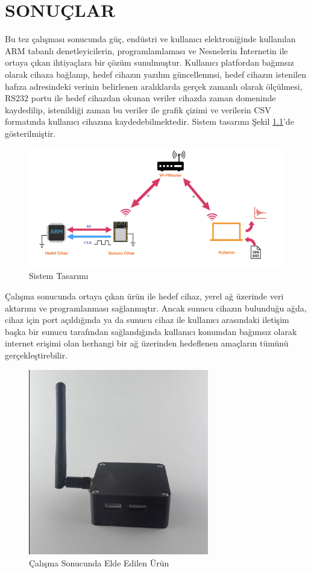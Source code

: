 \chapter{SONUÇLAR}

Bu tez çalışması sonucunda güç, endüstri ve kullanıcı elektroniğinde kullanılan ARM tabanlı denetleyicilerin, programlamlaması ve Nesnelerin İnternetin ile ortaya çıkan ihtiyaçlara bir çözüm sunulmuştur. Kullanıcı platfordan bağımsız olarak cihaza bağlanıp, hedef cihazın yazılım güncellenmsi, hedef cihazın istenilen hafıza adresindeki verinin belirlenen aralıklarda gerçek zamanlı olarak ölçülmesi, RS232 portu ile hedef cihazdan okunan veriler cihazda zaman domeninde kaydedilip, istenildiği zaman bu veriler ile grafik çizimi ve verilerin \acrfull{CSV} formatında kullanıcı cihazına kaydedebilmektedir. Sistem tasarımı Şekil \ref{fig:sistem}'de gösterilmiştir.

\begin{figure}[h]
\centering
\includegraphics[width=\textwidth]{gorseller/sistem}
\caption{Sistem Tasarımı}\label{fig:sistem}
\end{figure}

Çalışma sonucunda ortaya çıkan ürün ile hedef cihaz, yerel ağ üzerinde veri aktarımı ve programlanması sağlanmıştır. Ancak sunucu cihazın bulunduğu ağda, cihaz için port açıldığında ya da sunucu cihaz ile kullanıcı arasındaki iletişim başka bir sunucu tarafından sağlandığında kullanıcı konumdan bağımsız olarak internet erişimi olan herhangi bir ağ üzerinden hedeflenen amaçların tümünü gerçekleştirebilir.

\begin{figure}[h]
\centering
\includegraphics[width=0.7\textwidth]{gorseller/product}
\caption{Çalışma Sonucunda Elde Edilen Ürün}\label{fig:product}
\end{figure}

